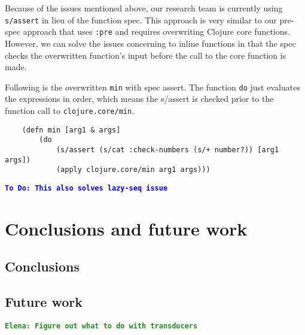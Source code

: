 \documentclass[12pt]{article}
\newcommand{\comment}[1]{{\bf \tt  {#1}}}
\newcommand{\emcomment}[1]{\textcolor{ForestGreen}{\comment{Elena: {#1}}}}
\newcommand{\todo}[1]{\textcolor{blue}{\comment{To Do: {#1}}}}
\begin{document}
	Because of the issues mentioned above, our research team is currently using {\tt s/assert} in lieu of the function spec.
	This approach is very similar to our pre-spec approach that uses {\tt :pre} and requires overwriting 
	Clojure core functions. However, we can solve the issues concerning to inline functions in that 
	the spec checks the overwritten function's input before the call to the core function is made. 
	
	Following is the overwritten {\tt min} with spec assert. The function {\tt do} just evaluates
	the expressions in order, which means the s/assert is checked prior to the function call to {\tt clojure.core/min}.
	
	\begin{verbatim}
	(defn min [arg1 & args]
  		(do 
    		(s/assert (s/cat :check-numbers (s/+ number?)) [arg1 args])
    		(apply clojure.core/min arg1 args)))
	\end{verbatim} 
	
	\todo{This also solves lazy-seq issue}
	
	
	
	

\section{Conclusions and future work}
	\subsection{Conclusions}
	\subsection{Future work}
\emcomment{Figure out what to do with transducers}
	


\end{document}
